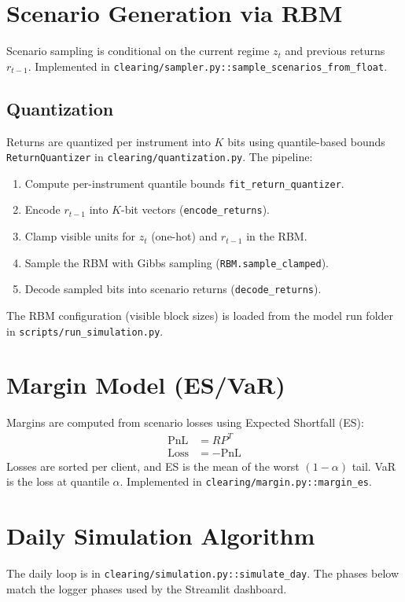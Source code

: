\documentclass[11pt]{article}
\begin{document}
\section{Scenario Generation via RBM}
Scenario sampling is conditional on the current regime $z_t$ and previous returns
$r_{t-1}$. Implemented in \texttt{clearing/sampler.py::sample\_scenarios\_from\_float}.

\subsection{Quantization}
Returns are quantized per instrument into $K$ bits using quantile-based bounds
\texttt{ReturnQuantizer} in \texttt{clearing/quantization.py}.
The pipeline:
\begin{enumerate}[leftmargin=*]
  \item Compute per-instrument quantile bounds \texttt{fit\_return\_quantizer}.
  \item Encode $r_{t-1}$ into $K$-bit vectors (\texttt{encode\_returns}).
  \item Clamp visible units for $z_t$ (one-hot) and $r_{t-1}$ in the RBM.
  \item Sample the RBM with Gibbs sampling (\texttt{RBM.sample\_clamped}).
  \item Decode sampled bits into scenario returns (\texttt{decode\_returns}).
\end{enumerate}
The RBM configuration (visible block sizes) is loaded from the model run folder
in \texttt{scripts/run\_simulation.py}.

\section{Margin Model (ES/VaR)}
Margins are computed from scenario losses using Expected Shortfall (ES):
\begin{align*}
\text{PnL} &= R P^T \\
\text{Loss} &= -\text{PnL}
\end{align*}
Losses are sorted per client, and ES is the mean of the worst $(1-\alpha)$ tail.
VaR is the loss at quantile $\alpha$. Implemented in
\texttt{clearing/margin.py::margin\_es}.

\section{Daily Simulation Algorithm}
The daily loop is in \texttt{clearing/simulation.py::simulate\_day}. The phases below
match the logger phases used by the Streamlit dashboard.
\end{document}

